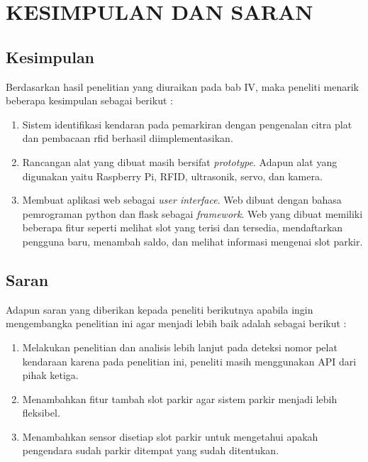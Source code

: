 \chapter{KESIMPULAN DAN SARAN}

\section{Kesimpulan}
Berdasarkan hasil penelitian yang diuraikan pada bab IV, maka peneliti menarik beberapa kesimpulan sebagai berikut :\newline
\begin{enumerate}[topsep=0pt,itemsep=0pt,partopsep=0pt, parsep=0pt]
    \item Sistem identifikasi kendaran pada pemarkiran dengan pengenalan citra plat dan pembacaan rfid berhasil diimplementasikan.
    \item Rancangan alat yang dibuat masih bersifat \textit{prototype}. Adapun alat yang digunakan yaitu Raspberry Pi, RFID, ultrasonik, servo, dan kamera.
    \item Membuat aplikasi web sebagai \textit{user interface}. Web dibuat dengan bahasa pemrograman python dan flask sebagai \textit{framework}. Web yang dibuat memiliki beberapa fitur seperti melihat slot yang terisi dan tersedia, mendaftarkan pengguna baru, menambah saldo, dan melihat informasi mengenai slot parkir.
\end{enumerate}

\section{Saran}
Adapun saran yang diberikan kepada peneliti berikutnya apabila ingin mengembangka penelitian ini agar menjadi lebih baik adalah sebagai berikut :\newline
\begin{enumerate}[topsep=0pt,itemsep=0pt,partopsep=0pt, parsep=0pt]
    \item Melakukan penelitian dan analisis lebih lanjut pada deteksi nomor pelat kendaraan karena pada penelitian ini, peneliti masih menggunakan API dari pihak ketiga.
    \item Menambahkan fitur tambah slot parkir agar sistem parkir menjadi lebih fleksibel.
    \item Menambahkan sensor disetiap slot parkir untuk mengetahui apakah pengendara sudah parkir ditempat yang sudah ditentukan.
\end{enumerate}